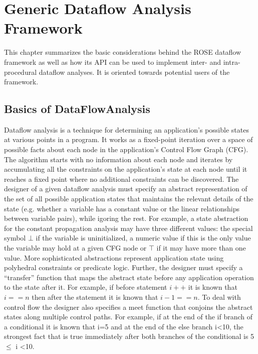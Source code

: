 \chapter{Generic Dataflow Analysis Framework}

This chapter summarizes the basic considerations behind the ROSE dataflow framework as well as how its API can be used to implement inter- and intra-procedural dataflow analyses. It is oriented towards potential users of the framework.

\section{Basics of DataFlowAnalysis}
\label{basics_dfa}
Dataflow analysis is a technique for determining an application’s possible states at various points in a program. It works as a fixed-point iteration over a space of possible facts about each node in the application’s Control Flow Graph (CFG). The algorithm starts with no information about each node and iterates by accumulating all the constraints on the application's state at each node until it reaches a fixed point where no additional constraints can be discovered. The designer of a given dataflow analysis must specify an abstract representation of the set of all possible application states that maintains the relevant details of the state (e.g. whether a variable has a constant value or the linear relationships between variable pairs), while igoring the rest. For example, a state abstraction for the constant propagation analysis may have three different values: the special symbol $\bot$ if the variable is uninitialized, a numeric value if this is the only value the variable may hold at a given CFG node or $\top$ if it may have more than one value. More sophisticated abstractions represent application state using polyhedral constraints or predicate logic.  Further, the designer must specify a ``transfer'' function that maps the abstract state before any application operation to the state after it. For example, if before statement $i++$ it is known that $i==n$ then after the statement it is known that $i-1==n$.  To deal with control flow the designer also specifies a meet function that conjoins the abstract states along multiple control paths. For example, if at the end of the {\scriptsize if} branch of a conditional it is known that i=5 and at the end of the {\scriptsize else} branch i\textless10, the strongest fact that is true immediately after both branches of the conditional is 5 $\le$ i \textless 10.
~\\
